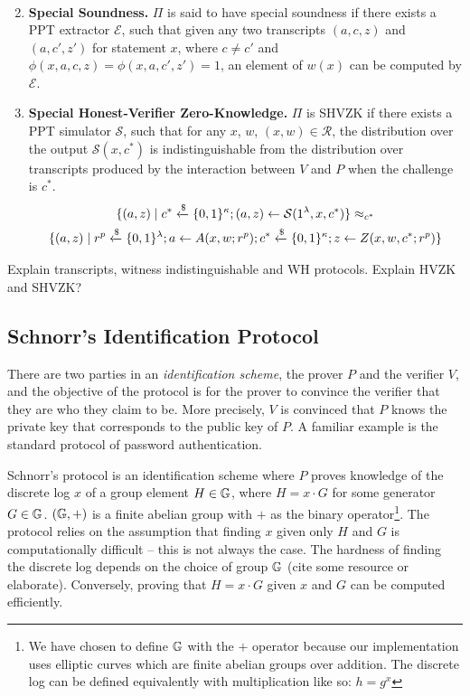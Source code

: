 \begin{definition}
\begin{enumerate}
\begin{gather*}
    \end{gather*}
    \item \textbf{Special Soundness.} $\Pi$ is said to have special soundness if  there exists a PPT extractor $\mathcal E$, such that given any two transcripts $(a,c,z)$ and $(a,c',z')$ for statement $x$, where $c \ne c'$ and $\phi(x,a,c,z) = \phi(x,a,c',z') = 1$, an element of $w(x)$ can be computed by $\mathcal E$.
    \item \textbf{Special Honest-Verifier Zero-Knowledge.} $\Pi$ is SHVZK if there exists a PPT simulator $\mathcal S$, such that for any $x$, $w$, $(x,w) \in \mathcal R$, the distribution over the output $\mathcal S(x, c^*)$ is indistinguishable from the distribution over transcripts produced by the interaction between $V$ and $P$ when the challenge is $c^*$.
    \begin{multline*}
        \{(a, z) \mid c^* \xleftarrow{\$} \{0,1\}^\kappa; (a,z) \leftarrow \mathcal S(1^\lambda,x,c^*)\} 
        \approx_{c^*} \\
        \{(a,z) \mid r^p \xleftarrow{\$} \{0,1\}^\lambda; a \leftarrow A(x,w;r^p); c^* \xleftarrow{\$} \{0,1\}^\kappa; z \leftarrow Z(x,w,c^*;r^p)\}
    \end{multline*}
    
\end{enumerate}


\end{definition}



Explain transcripts, witness indistinguishable and WH protocols. Explain HVZK and SHVZK?

\subsection{Schnorr's Identification Protocol}
There are two parties in an \textit{identification scheme}, the prover $P$ and the verifier $V$, and the objective of the protocol is for the prover to convince the verifier that they are who they claim to be. More precisely, $V$ is convinced that $P$ knows the private key that corresponds to the public key of $P$. A familiar example is the standard protocol of password authentication.

Schnorr's protocol \cite{Schnorr} is an identification scheme where $P$ proves knowledge of the discrete log $x$ of a group element $H \in \mathbb{G}$, where $H = x \cdot G$ for some generator $G \in \mathbb{G}$. $(\mathbb{G}, +)$ is a finite abelian group with $+$ as the binary operator\footnote{We have chosen to define $\mathbb{G}$ with the $+$ operator because our implementation uses elliptic curves which are finite abelian groups over addition. The discrete log can be defined equivalently with multiplication like so: $h = g^x$}. The protocol relies on the assumption that finding $x$ given only $H$ and $G$ is computationally difficult -- this is not always the case. The hardness of finding the discrete log depends on the choice of group $\mathbb{G}$ (cite some resource or elaborate). Conversely, proving that $H = x \cdot G$ given $x$ and $G$ can be computed efficiently. 


